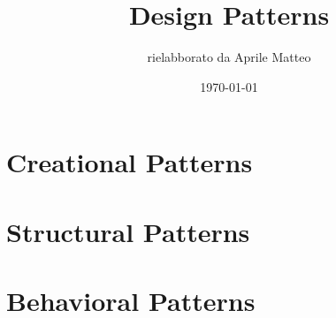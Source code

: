 \documentclass{report}
\title{Design Patterns}
\author{rielabborato da Aprile Matteo}
\date{\today}
\begin{document}
    \maketitle
    \tableofcontents

    \part{Creational Patterns}
    
    
    
    
    \part{Structural Patterns}
    
    
    

    \part{Behavioral Patterns}
    
    
    
    
\end{document}
